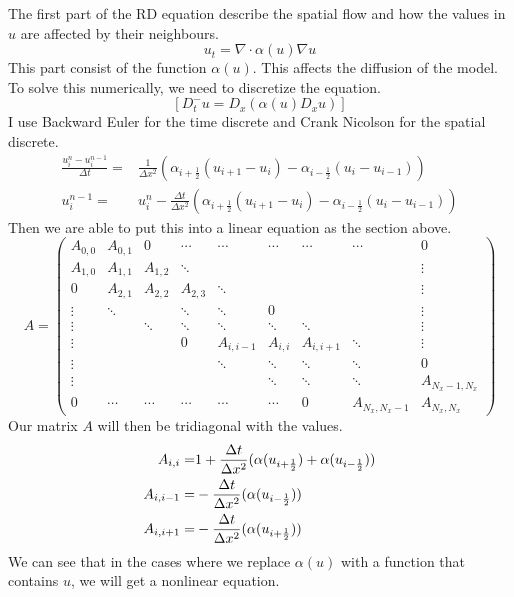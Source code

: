 \documentclass{book}
\begin{document}
The first part of the RD equation describe the spatial flow and how the values in $u$ are
affected by their neighbours.  
\begin{equation}
	u_t = \nabla \cdot \alpha(u)\nabla u
\end{equation}
This part consist of the function $\alpha(u)$. This
affects the diffusion of the model. 
To solve this numerically, we need to discretize the equation.
\begin{equation*}
	\left[D_t^-u=D_x(\alpha(u) D_x u)\right]
\end{equation*}
I use Backward Euler for the time discrete and Crank Nicolson for the spatial
discrete. 
\begin{align*}
	\frac{u^n_i-u^{n-1}_i}{\Delta t}=& \frac{1}{\Delta x^2}\left(\alpha_{i+\frac{1}{2}}(u_{i+1}-u_i)-\alpha_{i-\frac{1}{2}}(u_{i}-u_{i-1})\right)\\
	u^{n-1}_i=&u^n_i- \frac{\Delta t}{\Delta x^2}\left(\alpha_{i+\frac{1}{2}}(u_{i+1}-u_i)-\alpha_{i-\frac{1}{2}}(u_{i}-u_{i-1})\right)
\end{align*}
Then we are able to put this into a linear equation as the section above. 
\begin{equation}
A =
\left(
\begin{array}{cccccccccc}
A_{0,0} & A_{0,1} & 0
&\cdots &
\cdots & \cdots & \cdots &
\cdots & 0 \\
A_{1,0} & A_{1,1} & A_{1,2} & \ddots &   & &  & &  \vdots \\
0 & A_{2,1} & A_{2,2} & A_{2,3} &
\ddots & &  &  & \vdots \\
\vdots & \ddots &  & \ddots & \ddots & 0 &  & & \vdots \\
\vdots &  & \ddots & \ddots & \ddots & \ddots & \ddots & & \vdots \\
\vdots & &  & 0 & A_{i,i-1} & A_{i,i} & A_{i,i+1} & \ddots & \vdots \\
\vdots & & &  & \ddots & \ddots & \ddots &\ddots  & 0 \\
\vdots & & & &  &\ddots  & \ddots &\ddots  & A_{N_x-1,N_x} \\
0 &\cdots & \cdots &\cdots & \cdots & \cdots  & 0 & A_{N_x,N_x-1} & A_{N_x,N_x}
\end{array}
\right)
\tag{14}
\end{equation}
Our matrix $A$ will then be tridiagonal with the values.
\begin{align} \label{eq:matrix_spatial}
A_{i,i} =& 1+\frac{\Delta t}{\Delta x^2}(\alpha(u_{i+\frac{1}{2}})+\alpha(u_{i-\frac{1}{2}}))\notag\\
A_{i,i-1} =&-\frac{\Delta t}{\Delta x^2}(\alpha(u_{i-\frac{1}{2}}))\notag\\
A_{i,i+1} =&-\frac{\Delta t}{\Delta x^2}(\alpha(u_{i+\frac{1}{2}}))
\end{align}                               
We can see that in the cases where we replace
$\alpha(u)$ with a function that contains $u$, we will get a nonlinear equation.
\end{document}
